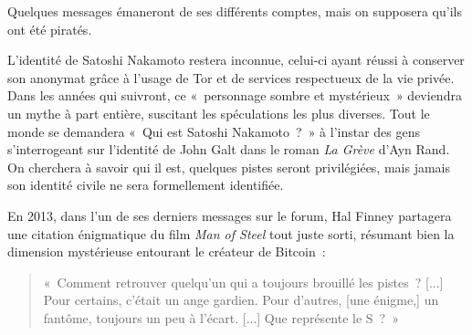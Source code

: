 Quelques messages émaneront de ses différents comptes, mais on supposera qu'ils ont été piratés.


L'identité de Satoshi Nakamoto restera inconnue, celui-ci ayant réussi à conserver son anonymat grâce à l'usage de Tor et de services respectueux de la vie privée. Dans les années qui suivront, ce «~personnage sombre et mystérieux~» deviendra un mythe à part entière, suscitant les spéculations les plus diverses. Tout le monde se demandera «~Qui est Satoshi Nakamoto~?~» à l'instar des gens s'interrogeant sur l'identité de John Galt dans le roman \emph{La Grève} d'Ayn Rand. On cherchera à savoir qui il est, quelques pistes seront privilégiées, mais jamais son identité civile ne sera formellement identifiée.

En 2013, dans l'un de ses derniers messages sur le forum, Hal Finney partagera une citation énigmatique du film \emph{Man of Steel} tout juste sorti, résumant bien la dimension mystérieuse entourant le créateur de Bitcoin~:

\begin{quote}
«~Comment retrouver quelqu'un qui a toujours brouillé les pistes~? [...] Pour certains, c'était un ange gardien. Pour d'autres, [une énigme,] un fantôme, toujours un peu à l'écart. [...] Que représente le S~?~» %
\end{quote} 

